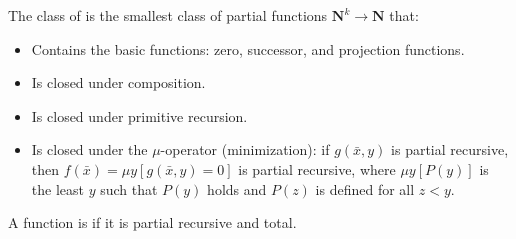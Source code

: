 The class of  is the smallest class of partial functions $\mathbf{N}^k \to \mathbf{N}$ that:
\begin{itemize}
\item Contains the basic functions: zero, successor, and projection functions.
\item Is closed under composition.
\item Is closed under primitive recursion.
\item Is closed under the $\mu$-operator (minimization): if $g(\bar{x}, y)$ is partial recursive, then $f(\bar{x}) = \mu y[g(\bar{x}, y) = 0]$ is partial recursive, where $\mu y[P(y)]$ is the least $y$ such that $P(y)$ holds and $P(z)$ is defined for all $z < y$.
\end{itemize}
A function is  if it is partial recursive and total.
